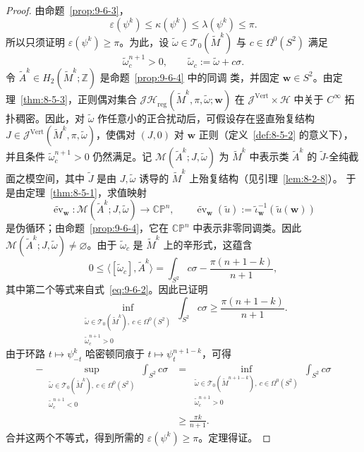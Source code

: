 \begin{proof}
由命题~\ref{prop:9-6-3}，
\[
  \varepsilon(\psi^k)\le\kappa(\psi^k)
  \le\lambda(\psi^k)\le\pi.
\]
所以只须证明
$\varepsilon(\psi^k)\ge\pi$。为此，设
$\widetilde\omega\in\mathcal T_0(\widetilde M^k)$ 与
$c\in\Omega^0(S^2)$ 满足
\[
  \widetilde\omega_c^{n+1}>0,
  \qquad \widetilde\omega_c:=\widetilde\omega+c\sigma.
\]
令 $\widetilde A^k\in H_2(\widetilde M^k;\mathbb Z)$ 是命题~\ref{prop:9-6-4} 中的同调
类，并固定 $\mathbf w\in S^2$。由定理~\ref{thm:8-5-3}，正则偶对集合
$\mathcal{JH}_{\mathrm{reg}}(\widetilde M^k,\pi,\widetilde\omega;\mathbf w)$ 在
$\mathcal J^{\mathrm{Vert}}\times\mathcal H$ 中关于 $C^\infty$ 拓扑稠密。因此，对
$\widetilde\omega$ 作任意小的正合扰动后，可假设存在竖直殆复结构
$J\in\mathcal J^{\mathrm{Vert}}(\widetilde M^k,\pi,\widetilde\omega)$，使偶对 $(J,0)$
对 $\mathbf w$ 正则（定义~\ref{def:8-5-2} 的意义下），并且条件
$\widetilde\omega_c^{n+1}>0$ 仍然满足。记
$\mathcal M(\widetilde A^k;J,\widetilde\omega)$ 为 $\widetilde M^k$ 中表示类
$\widetilde A^k$ 的 $\widetilde J$-全纯截面之模空间，其中 $\widetilde J$ 是由
$J,\widetilde\omega$ 诱导的 $\widetilde M^k$ 上殆复结构（见引理~\ref{lem:8-2-8}）。
于是由定理~\ref{thm:8-5-1}，求值映射
\[
  \widetilde{\operatorname{ev}}_{\mathbf w}:
  \mathcal M(\widetilde A^k;J,\widetilde\omega)
  \longrightarrow\mathbb{CP}^n,
  \qquad
  \widetilde{\operatorname{ev}}_{\mathbf w}(\widetilde u)
  :=\widetilde\iota_{\mathbf w}^{-1}(\widetilde u(\mathbf w))
\]
是伪循环；由命题~\ref{prop:9-6-4}，它在 $\mathbb{CP}^n$ 中表示非零同调类。因此
$\mathcal M(\widetilde A^k;J,\widetilde\omega)\ne\varnothing$。由于
$\widetilde\omega_c$ 是 $\widetilde M^k$ 上的辛形式，这蕴含
\[
  0\le\langle[\widetilde\omega_c],\widetilde A^k\rangle
  =\int_{S^2}c\sigma-\frac{\pi(n+1-k)}{n+1},
\]
其中第二个等式来自式~\eqref{eq:9-6-2}。因此已证明
\[
  \inf_{\substack{
    \widetilde\omega\in\mathcal T_0(\widetilde M^k),\ c\in\Omega^0(S^2)\\
    \widetilde\omega_c^{n+1}>0}}
  \int_{S^2}c\sigma
  \ge\frac{\pi(n+1-k)}{n+1}.
\]
由于环路 $t\mapsto\psi_{-t}^k$ 哈密顿同痕于
$t\mapsto\psi_t^{n+1-k}$，可得
\[
\begin{aligned}
  -\sup_{\substack{
    \widetilde\omega\in\mathcal T_0(\widetilde M^k),\ c\in\Omega^0(S^2)\\
    \widetilde\omega_c^{n+1}<0}}
  \int_{S^2}c\sigma
  &={}\inf_{\substack{
    \widetilde\omega\in\mathcal T_0(\widetilde M^{n+1-k}),\ c\in\Omega^0(S^2)\\
    \widetilde\omega_c^{n+1}>0}}
  \int_{S^2}c\sigma\\
  &\ge\frac{\pi k}{n+1}.
\end{aligned}
\]
合并这两个不等式，得到所需的
$\varepsilon(\psi^k)\ge\pi$。定理得证。
\end{proof}

